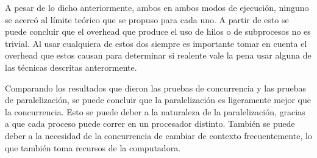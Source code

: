 \documentclass{report}
\begin{document}
A pesar de lo dicho anteriormente, ambos en ambos modos de ejecución, ninguno se acercó al límite teórico que se propuso para cada uno.
A partir de esto se puede concluir que el overhead que produce el uso de hilos o de subprocesos no es trivial.
Al usar cualquiera de estos dos siempre es importante tomar en cuenta el overhead que estos causan para determinar si realente vale la pena usar alguna de las técnicas descritas anterormente.

Comparando los resultados que dieron las pruebas de concurrencia y las pruebas de paralelización, se puede concluir que la paralelización es ligeramente mejor que la concurrencia.
Esto se puede deber a la naturaleza de la paralelización, gracias a que cada proceso puede correr en un procesador distinto. 
También se puede deber a la necesidad de la concurrencia de cambiar de contexto frecuentemente, lo que también toma recursos de la computadora.





%

\end{document}
